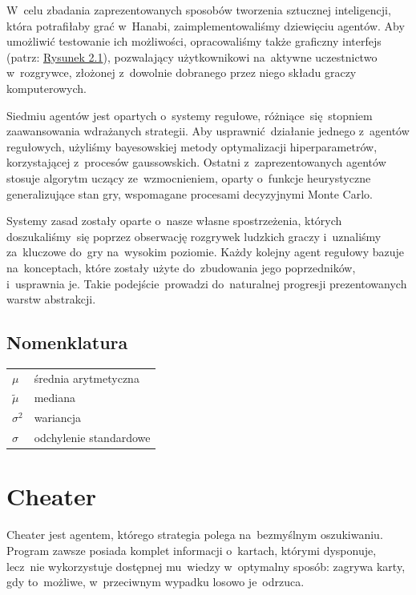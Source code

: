 \documentclass[declaration,shortabstract,inz]{iithesis}
\begin{document}
W~celu zbadania zaprezentowanych sposobów tworzenia sztucznej inteligencji, która potrafiłaby grać w~Hanabi, zaimplementowaliśmy dziewięciu agentów. Aby umożliwić testowanie ich możliwości, opracowaliśmy także graficzny interfejs (patrz: \hyperref[fig:GUI]{Rysunek 2.1}), pozwalający użytkownikowi na~aktywne uczestnictwo w~rozgrywce, złożonej z~dowolnie dobranego przez niego składu graczy komputerowych.

Siedmiu agentów jest opartych o~systemy regułowe, różniące~się stopniem zaawansowania wdrażanych strategii. Aby usprawnić działanie jednego z~agentów regułowych, użyliśmy bayesowskiej metody optymalizacji hiperparametrów, korzystającej z~procesów gaussowskich. Ostatni z~zaprezentowanych agentów stosuje algorytm uczący ze~wzmocnieniem, oparty o~funkcje heurystyczne generalizujące stan gry, wspomagane procesami decyzyjnymi Monte Carlo.

Systemy zasad zostały oparte o~nasze własne spostrzeżenia, których doszukaliśmy~się poprzez obserwację rozgrywek ludzkich graczy i~uznaliśmy za~kluczowe do~gry na~wysokim poziomie. Każdy kolejny agent regułowy bazuje na~konceptach, które zostały użyte do~zbudowania jego poprzedników, i~usprawnia je. Takie podejście~prowadzi do~naturalnej progresji prezentowanych warstw abstrakcji.

\subsection*{Nomenklatura}

\begin{tabular}{@{}>{$}l<{$}@{ --- }l@{}}
	\mu & średnia arytmetyczna \\
	\tilde{\mu} & mediana \\
	\sigma^2 & wariancja \\
	\sigma & odchylenie standardowe \\
\end{tabular}

\newpage

\section{Cheater}

Cheater jest agentem, którego strategia polega na~bezmyślnym oszukiwaniu. Program zawsze posiada komplet informacji o~kartach, którymi dysponuje, lecz~nie wykorzystuje dostępnej mu~wiedzy w~optymalny sposób: zagrywa karty, gdy to~możliwe, w~przeciwnym wypadku losowo je~odrzuca.
\end{document}
